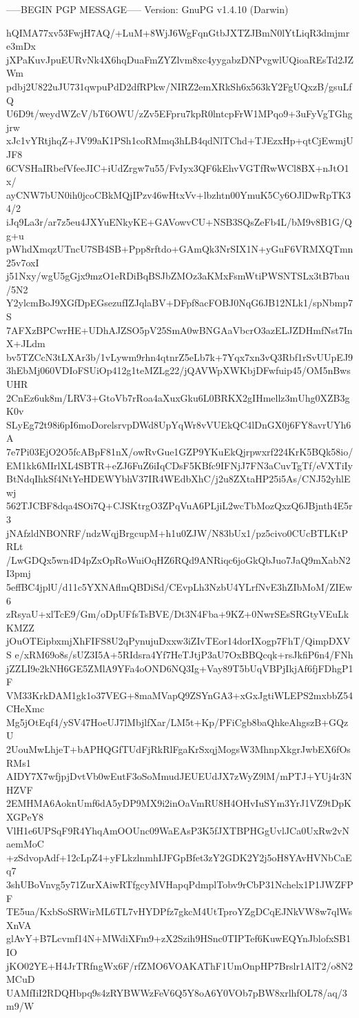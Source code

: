 -----BEGIN PGP MESSAGE-----
Version: GnuPG v1.4.10 (Darwin)

hQIMA77xv53FwjH7AQ/+LuM+8WjJ6WgFqnGtbJXTZJBmN0lYtLiqR3dmjmre3mDx
jXPaKuvJpuEURvNk4X6hqDuaFmZYZlvm8xc4yygabzDNPvgwlUQioaREsTd2JZWm
pdbj2U822uJU731qwpuPdD2dfRPkw/NIRZ2emXRkSh6x563kY2FgUQxzB/gsuLfQ
U6D9t/weydWZcV/bT6OWU/zZv5EFpru7kpR0lntcpFrW1MPqo9+3uFyVgTGhgjrw
xJc1vYRtjhqZ+JV99aK1PSh1coRMmq3hLB4qdNlTChd+TJEzxHp+qtCjEwmjUJF8
6CVSHaIRbefVfeeJIC+iUdZrgw7u55/FvIyx3QF6kEhvVGTfRwWCl8BX+nJtO1x/
ayCNW7bUN0ih0jcoCBkMQjIPzv46wHtxVv+lbzhtn00YmuK5Cy6OJlDwRpTK34/2
iJq9La3r/ar7z5eu4JXYuENkyKE+GAVowvCU+NSB3SQsZeFb4L/bM9v8B1G/Qg+u
pWhdXmqzUTncU7SB4SB+Ppp8rftdo+GAmQk3NrSIX1N+yGuF6VRMXQTmn25v7oxI
j51Nxy/wgU5gGjx9mzO1eRDiBqBSJbZMOz3aKMxFsmWtiPWSNTSLx3tB7bau/5N2
Y2ylcmBoJ9XGfDpEGsezufIZJqlaBV+DFpf8acFOBJ0NqG6JB12NLk1/spNbmp7S
7AFXzBPCwrHE+UDhAJZSO5pV25SmA0wBNGAaVbcrO3azELJZDHmfNst7InX+JLdm
bv5TZCcN3tLXAr3b/1vLywm9rhn4qtnrZ5eLb7k+7Yqx7xn3vQ3Rbf1rSvUUpEJ9
3hEbMj060VDIoFSUiOp412g1teMZLg22/jQAVWpXWKbjDFwfuip45/OM5nBwsUHR
2CnEz6uk8m/LRV3+GtoVb7rRoa4aXuxGku6L0BRKX2gIHmellz3mUhg0XZB3gK0v
SLyEg72t98i6pI6moDorelsrvpDWd8UpYqWr8vVUEkQC4lDnGX0j6FY8avrUYh6A
7e7Pi03EjO2O5fcABpF81nX/owRvGue1GZP9YKuEkQjrpwxrf224KrK5BQk58io/
EM1kk6MIrlXL4SBTR+eZJ6FuZ6iIqCDsF5KBfc9IFNjJ7FN3aCuvTgTf/eVXTiIy
BtNdqIhkSf4NtYeHDEWYbhV37IR4WEdbXhC/j2u8ZXtaHP25i5As/CNJ52yhlEwj
562TJCBF8dqa4SOi7Q+CJSKtrgO3ZPqVuA6PLjiL2wcTbMozQxzQ6JBjnth4E5r3
jNAfzldNBONRF/ndzWqjBrgcupM+h1u0ZJW/N83bUx1/pz5civo0CUcBTLKtPRLt
/LwGDQx5wn4D4pZxOpRoWuiOqHZ6RQd9ANRiqc6joGkQbJuo7JaQ9mXabN2I3pmj
5effBC4jplU/d11c5YXNAflmQBDiSd/CEvpLh3NzbU4YLrfNvE3hZIbMoM/ZIEw6
zRsyaU+xlTcE9/Gm/oDpUFfsTsBVE/Dt3N4Fba+9KZ+0NwrSEsSRGtyVEuLkKMZZ
jOuOTEipbxmjXhFIFS8U2qPynujuDxxw3iZIvTEor14dorIXogp7FhT/QimpDXVS
e/xRM69o8s/sUZ3I5A+5RIdsra4Yf7HeTJtjP3aU7OxBBQcqk+rsJkfiP6n4/FNh
jZZLI9e2kNH6GE5ZMlA9YFa4oOND6NQ3Ig+Vay89T5bUqVBPjIkjAf6fjFDhgP1F
VM33KrkDAM1gk1o37VEG+8maMVapQ9ZSYnGA3+xGxJgtiWLEPS2mxbbZ54CHeXmc
Mg5jOtEqf4/ySV47HoeUJ7lMbjlfXar/LM5t+Kp/PFiCgb8baQhkeAhgszB+GQzU
2UouMwLhjeT+bAPHQGfTUdFjRkRlFgaKrSxqjMogsW3MhnpXkgrJwbEX6fOsRMs1
AIDY7X7wfjpjDvtVb0wEutF3oSoMmudJEUEUdJX7zWyZ9lM/mPTJ+YUj4r3NHZVF
2EMHMA6AoknUmf6dA5yDP9MX9i2inOaVmRU8H4OHvIuSYm3YrJ1VZ9tDpKXGPeY8
VlH1e6UPSqF9R4YhqAmOOUnc09WaEAsP3K5fJXTBPHGgUvlJCa0UxRw2vNaemMoC
+zSdvopAdf+12cLpZ4+yFLkzlnmhIJFGpBfet3zY2GDK2Y2j5oH8YAvHVNbCaEq7
3shUBoVnvg5y71ZurXAiwRTfgcyMVHapqPdmplTobv9rCbP31Nchelx1P1JWZFPF
TE5ua/KxbSoSRWirML6TL7vHYDPfz7gkcM4UtTproYZgDCqEJNkVW8w7qlWsXnVA
glAvY+B7Lcvmf14N+MWdiXFm9+zX2Szih9HSnc0TIPTef6KuwEQYnJblofxSB1IO
jKO02YE+H4JrTRfngWx6F/rfZMO6VOAKAThF1UmOnpHP7Brslr1AlT2/o8N2MCuD
UAMfIiI2RDQHbpq9s4zRYBWWzFeV6Q5Y8oA6Y0VOb7pBW8xrlhfOL78/aq/3m9/W
